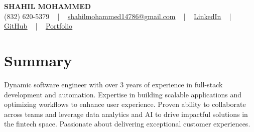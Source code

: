 \documentclass[letterpaper,10pt]{article}
\begin{document}
\begin{center}
    {\fontsize{14pt}{12pt}\selectfont \textbf{\MakeUppercase{Shahil Mohammed}}}\\ \vspace{2pt}
    \fontsize{10pt}{12pt}\selectfont (832) 620-5379 ~ | ~ \href{mailto:shahilmohammed14786@gmail.com}{shahilmohammed14786@gmail.com} ~ | ~  
    \href{https://www.linkedin.com/in/shahil-mohammed-9652931a1/}{\color{blue}\underline{LinkedIn}}  ~ | ~ 
    \href{https://github.com/freakbeast14}{\color{blue}\underline{GitHub}} ~ | ~ 
    \href{https://shahil-mohammed.netlify.app/}{\color{blue}\underline{Portfolio}}
    \vspace{-8pt}
\end{center}

\section{Summary}
\vspace{-2pt}\fontsize{8pt}{9pt}\selectfont
Dynamic software engineer with over 3 years of experience in full-stack development and automation. Expertise in building scalable applications and optimizing workflows to enhance user experience. Proven ability to collaborate across teams and leverage data analytics and AI to drive impactful solutions in the fintech space. Passionate about delivering exceptional customer experiences.

\vspace{-5pt}

\vspace{-2pt}
\end{document}
